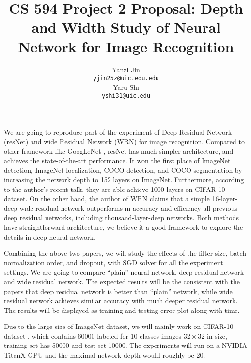 \documentclass{article} %
\title{CS 594 Project 2 Proposal: Depth and Width Study of Neural Network for Image Recognition}
\author{
Yanzi Jin \\
\texttt{yjin25z@uic.edu.edu} \\
\And
Yaru Shi \\
\texttt{yshi31@uic.edu} \\
}
\begin{document}
\maketitle

We are going to reproduce part of the experiment of Deep Residual Network (resNet) \cite{he2015deep} and wide Residual Network (WRN) \cite{zagoruyko2016wide} for image recognition. Compared to other framework like GoogLeNet \cite{szegedy2015going}, resNet has much simpler architecture, and achieves the state-of-the-art performance. It won the first place of ImageNet detection, ImageNet localization, COCO detection, and COCO segmentation by increasing the network depth to 152 layers on ImageNet. Furthermore, according to the author's recent talk, they are able achieve 1000 layers on CIFAR-10 dataset. On the other hand, the author of WRN claims that a simple 16-layer-deep wide residual network outperforms in accuracy and efficiency all previous deep residual networks, including thousand-layer-deep networks. Both methods have straightforward architecture, we believe it a good framework to explore the details in deep neural network. 

Combining the above two papers, we will study the effects of the filter size, batch normalization order, and dropout, with SGD solver for all the experiment settings. We are going to compare ``plain'' neural network, deep residual network and wide residual network. The expected results will be the consistent with the papers that deep residual network is better than ``plain'' network, while wide residual network achieves similar accuracy with much deeper residual network. The results will be displayed as training and testing error plot along with time. 

Due to the large size of ImageNet dataset, we will mainly work on CIFAR-10 dataset \cite{krizhevsky2009learning}, which contains 60000 labeled for 10 classes images $32\times32$ in size, training set has 50000 and test set 10000. The experiments will run on a NVIDIA TitanX GPU and the maximal network depth would roughly be 20. 


 
\end{document}
